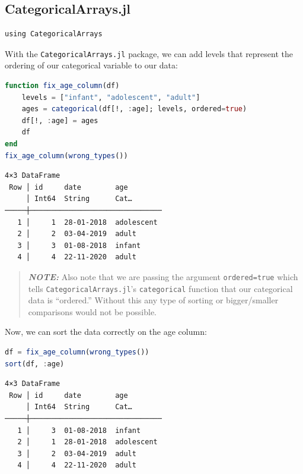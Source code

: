 \documentclass[
  notoc %
]{tufte-book}
\newcommand{\passthrough}[1]{#1}
\begin{document}
\hypertarget{sec:categoricalarrays}{%
\subsection{CategoricalArrays.jl}\label{sec:categoricalarrays}}

\begin{lstlisting}
using CategoricalArrays
\end{lstlisting}

With the \passthrough{\lstinline!CategoricalArrays.jl!} package, we can
add levels that represent the ordering of our categorical variable to
our data:

\begin{lstlisting}[language=Julia]
function fix_age_column(df)
    levels = ["infant", "adolescent", "adult"]
    ages = categorical(df[!, :age]; levels, ordered=true)
    df[!, :age] = ages
    df
end
fix_age_column(wrong_types())
\end{lstlisting}

\begin{lstlisting}[language=Output]
4×3 DataFrame
 Row │ id     date        age
     │ Int64  String      Cat…
─────┼───────────────────────────────
   1 │     1  28-01-2018  adolescent
   2 │     2  03-04-2019  adult
   3 │     3  01-08-2018  infant
   4 │     4  22-11-2020  adult
\end{lstlisting}

\begin{quote}
\textbf{\emph{NOTE:}} Also note that we are passing the argument
\passthrough{\lstinline!ordered=true!} which tells
\passthrough{\lstinline!CategoricalArrays.jl!}'s
\passthrough{\lstinline!categorical!} function that our categorical data
is ``ordered.'' Without this any type of sorting or bigger/smaller
comparisons would not be possible.
\end{quote}

Now, we can sort the data correctly on the age column:

\begin{lstlisting}[language=Julia]
df = fix_age_column(wrong_types())
sort(df, :age)
\end{lstlisting}

\begin{lstlisting}[language=Output]
4×3 DataFrame
 Row │ id     date        age
     │ Int64  String      Cat…
─────┼───────────────────────────────
   1 │     3  01-08-2018  infant
   2 │     1  28-01-2018  adolescent
   3 │     2  03-04-2019  adult
   4 │     4  22-11-2020  adult
\end{lstlisting}
\end{document}
